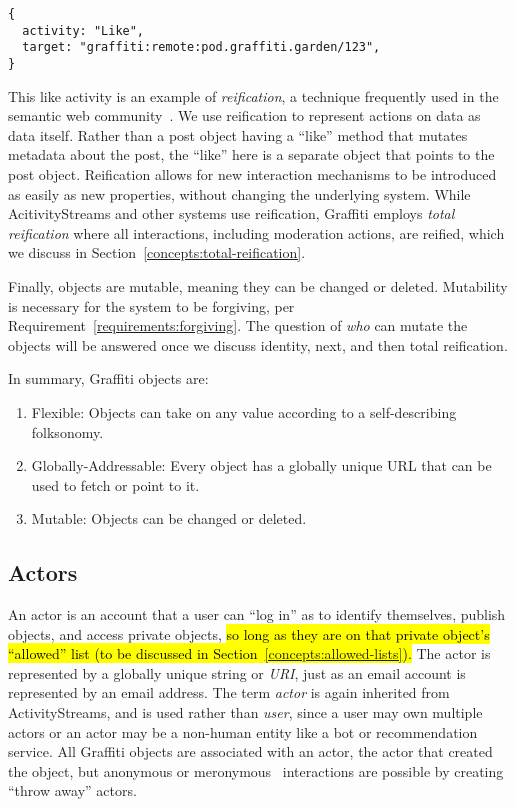 \begin{verbatim}
{
  activity: "Like",
  target: "graffiti:remote:pod.graffiti.garden/123",
}
\end{verbatim}

This like activity is an example of \emph{reification},
a technique frequently used in the semantic web community~\cite{rdfprimer}.   We use reification to represent actions on data as data itself.
Rather than a post object having a ``like'' method that mutates metadata about the post,
the ``like'' here is a separate object that points to the post object.
Reification allows for new interaction mechanisms to be introduced as easily as new properties,
without changing the underlying system.
While AcitivityStreams and other systems use reification,
Graffiti employs \emph{total reification} where
all interactions, including moderation actions, are reified,
which we discuss in
Section~\ref{concepts:total-reification}.

Finally, objects are mutable, meaning they can be changed or deleted.
Mutability is necessary for the system to be forgiving, per Requirement~\ref{requirements:forgiving}.
The question of \emph{who} can mutate the objects
will be answered once we discuss identity, next, and then total reification.

In summary, Graffiti objects are:

\begin{enumerate}
\item
Flexible: Objects can take on any value according to a self-describing folksonomy.
\item
Globally-Addressable: Every object has a globally unique URL that can be used to fetch or point to it.
\item
Mutable: Objects can be changed or deleted.
\end{enumerate}

\subsection{Actors}
\label{concepts:actors}

An actor is an account that a user can ``log in'' as
to identify themselves, publish objects, and access private objects,
\hl{%
so long as they are on that private object's ``allowed'' list
(to be discussed in Section~{\ref{concepts:allowed-lists}}).
}%
The actor is represented by a globally unique string or \emph{URI},
just as an email account is represented by an email address.
The term \emph{actor} is again inherited from ActivityStreams,
and is used rather than \emph{user}, since a user may own
multiple actors or
an actor may be a non-human entity
like a bot or recommendation service.
All Graffiti objects are associated with an actor, the actor
that created the object, but anonymous
or meronymous~\cite{meronymous} interactions are possible by
creating ``throw away'' actors.


